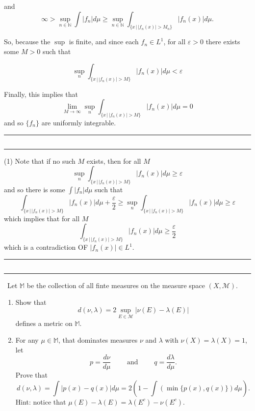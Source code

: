 \documentclass[12pt]{Homework}
\newcommand{\hhline}{\vspace{0.25cm}
    \hrule
    $\,$\vspace{-0.25cm}
    \hrule
    \vspace{0.25cm}}
\begin{document}
\begin{solution}
\begin{enumerate}[label=(\alph*)]
    and $$\infty>\sup_{n\in\mathbb{N}}\int|f_n|d\mu\ge\sup_{n\in\mathbb{N}}\int_{\{x\,|\,|f_n(x)|>M_n\}}|f_n(x)|d\mu.$$
    
    So, because the $\sup$ is finite, and since each $f_n\in L^1$, for all $\varepsilon>0$ there exists some $M>0$ such that
    
    \begin{equation}\tag{1}
        \sup_n\int_{\{x\,|\,|f_n(x)|>M\}}|f_n(x)|d\mu<\varepsilon
    \end{equation}
    
    Finally, this implies that $$\lim_{M\to\infty}\sup_n\int_{\{x\,|\,|f_n(x)|>M\}}|f_n(x)|d\mu=0$$ and so $\{f_n\}$ are uniformly integrable.
    
    \hhline
    
    (1) Note that if no such $M$ exists, then for all $M$ $$\sup_n\int_{\{x\,|\,|f_n(x)|>M\}}|f_n(x)|d\mu\ge\varepsilon$$ and so there is some $\int|f_n|d\mu$ such that $$\int_{\{x\,|\,|f_n(x)|>M\}}|f_n(x)|d\mu+\frac{\varepsilon}{2}\ge\sup_n\int_{\{x\,|\,|f_n(x)|>M\}}|f_n(x)|d\mu\ge\varepsilon$$ which implies that for all $M$ $$\int_{\{x\,|\,|f_n(x)|>M\}}|f_n(x)|d\mu\ge\frac{\varepsilon}{2}$$ which is a contradiction OF $|f_n(x)|\in L^1$.
    
    \hhline
\end{enumerate}
\end{solution}
\newpage

\begin{problem} $\,$
Let $\mathbb{M}$ be the collection of all finte measures on the measure space $(X,\mathscr{M})$.
\begin{enumerate}[label=(\alph*)]
    \item Show that $$d(\nu,\lambda)=2\sup_{E\in\mathscr{M}}|\nu(E)-\lambda(E)|$$ defines a metric on $\mathbb{M}$.
    \item For any $\mu\in\mathbb{M}$, that dominates measures $\nu$ and $\lambda$ with $\nu(X)=\lambda(X)=1$, let $$p=\frac{d\nu}{d\mu}\qquad\text{ and }\qquad q=\frac{d\lambda}{d\mu}.$$ Prove that $$d(\nu,\lambda)=\int|p(x)-q(x)|d\mu=2\left(1-\int(\min\{p(x),q(x)\})d\mu\right).$$
    Hint: notice that $\mu(E)-\lambda(E)=\lambda(E^c)-\nu(E^c)$.
\end{enumerate}
\end{problem}
\end{document}
